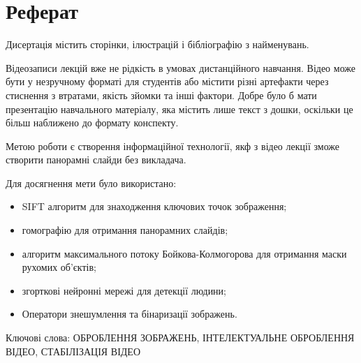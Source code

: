 \chapter*{Реферат}

Дисертація містить
\pageref{LastPage}
сторінки,
ілюстрацій
і бібліографію з
найменувань.

Відеозаписи лекцій вже не рідкість в умовах дистанційного навчання.
Відео може бути у незручному форматі для студентів або містити різні артефакти
через стиснення з втратами, якість зйомки та  інші фактори. Добре було б мати
презентацію навчального матеріалу, яка містить лише текст з дошки,
оскільки це більш наближено до формату конспекту.

Метою роботи є створення інформаційної технології, якф з відео лекції
зможе створити панорамні слайди без викладача.

Для досягнення мети було використано:
\begin{itemize}
  \item
        SIFT алгоритм для знаходження ключових точок зображення;
  \item   
        гомографію для отримання панорамних слайдів;
  \item
        алгоритм максимального потоку Бойкова-Колмогорова
        для отримання маски рухомих об'єктів;
  \item
        згорткові нейронні мережі для детекції людини;
  \item
        Оператори знешумлення та бінаризації зображень.
\end{itemize}

Ключові слова:
\MakeUppercase{оброблення зображень, інтелектуальне оброблення відео,
  стабілізація відео}
